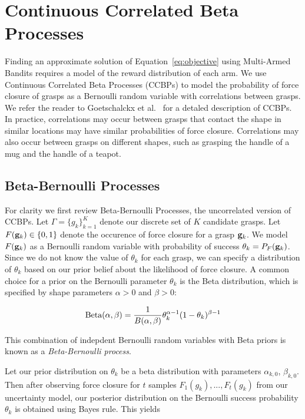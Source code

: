 \section{Continuous Correlated Beta Processes}

Finding an approximate solution of Equation~\ref{eq:objective} using Multi-Armed Bandits requires a model of the reward distribution of each arm.
We use Continuous Correlated Beta Processes (CCBPs) to model the probability of force closure of grasps as a Bernoulli random variable with correlations between grasps.
We refer the reader to Goetschalckx et al.~\cite{} for a detaled description of CCBPs.
In practice, correlations may occur between grasps that contact the shape in similar locations may have similar probabilities of force closure.
Correlations may also occur between grasps on different shapes, such as grasping the handle of a mug and the handle of a teapot.

\subsection{Beta-Bernoulli Processes}

For clarity we first review Beta-Bernoulli Processes, the uncorrelated version of CCBPs. 
Let $\Gamma = \{g_k\}_{k=1}^K$ denote our discrete set of $K$ candidate grasps.
Let $F(\mathbf{g}_k) \in \{0, 1\}$ denote the occurence of force closure for a grasp $\mathbf{g}_k$.
We model $F(\mathbf{g}_k)$ as a Bernoulli random variable with probability of success $\theta_k = P_F(\mathbf{g}_k)$.
Since we do not know the value of $\theta_k$ for each grasp, we can specify a distribution of $\theta_k$ based on our prior belief about the likelihood of force closure.
A common choice for a prior on the Bernoulli parameter $\theta_k$ is the Beta distribution, which is specified by shape parameters $\alpha > 0$ and $\beta > 0$:

\vspace{-2ex}
\begin{align*}
	\text{Beta}(\alpha, \beta) = \frac{1}{B(\alpha, \beta)} \theta_k^{\alpha-1} (1 - \theta_k)^{\beta-1}
\end{align*}

\noindent This combination of indepdent Bernoulli random variables with Beta priors is known as a {\it Beta-Bernoulli process}.

Let our prior distribution on $\theta_k$ be a beta distribution with parameters $\alpha_{k,0}$, $\beta_{k,0}$.
Then after observing force closure for $t$ samples $F_{1}(g_k), ..., F_{t}(g_k)$ from our uncertainty model, our posterior distribution on the Bernoulli success probability $\theta_k$ is obtained using Bayes rule.
This yields~\cite{laskey2015bandits}

